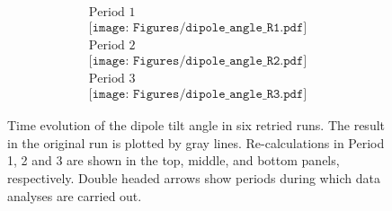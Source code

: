 \begin{figure}[ht]
\begin{center}
\[
\begin{array}{c}
\mbox{Period 1} \\
\texttt{[image: Figures/dipole\_angle\_R1.pdf]} \\
\mbox{Period 2} \\
\texttt{[image: Figures/dipole\_angle\_R2.pdf]} \\
\mbox{Period 3} \\
\texttt{[image: Figures/dipole\_angle\_R3.pdf]}
\end{array}
\]
\end{center}
\caption{
Time evolution of the dipole tilt angle in six retried runs. 
The result in the original run is plotted by gray lines. 
Re-calculations in Period 1, 2 and 3 are shown in the top, middle, and bottom panels, respectively. 
Double headed arrows show periods during which data analyses are carried out.
 }
\label{fig:dipole_tilt_retries}
\end{figure}